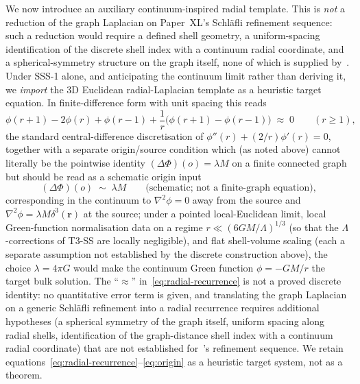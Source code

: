 \documentclass[12pt]{article}
\theoremstyle{definition}
\theoremstyle{remark}
\begin{document}
We now introduce an auxiliary continuum-inspired radial template. This is \emph{not} a reduction of the graph Laplacian on Paper~XL's Schl\"afli refinement sequence: such a reduction would require a defined shell geometry, a uniform-spacing identification of the discrete shell index with a continuum radial coordinate, and a spherical-symmetry structure on the graph itself, none of which is supplied by~\citep{SmartXL}. Under SSS-1 alone, and anticipating the continuum limit rather than deriving it, we \emph{import} the 3D Euclidean radial-Laplacian template as a heuristic target equation. In finite-difference form with unit spacing this reads
\begin{equation}\label{eq:radial-recurrence}
\phi(r+1) - 2\phi(r) + \phi(r-1) + \frac{1}{r}\bigl(\phi(r+1) - \phi(r-1)\bigr) \;\approx\; 0 \qquad (r \geq 1),
\end{equation}
the standard central-difference discretisation of $\phi''(r) + (2/r) \phi'(r) = 0$, together with a separate origin/source condition which (as noted above) cannot literally be the pointwise identity $(\Delta \Phi)(o) = \lambda M$ on a finite connected graph but should be read as a schematic origin input
\begin{equation}\label{eq:origin}
(\Delta \Phi)(o) \;\sim\; \lambda M \qquad \text{(schematic; not a finite-graph equation),}
\end{equation}
corresponding in the continuum to $\nabla^2 \phi = 0$ away from the source and $\nabla^2 \phi = \lambda M \delta^3(\mathbf{r})$ at the source; under a pointed local-Euclidean limit, local Green-function normalisation data on a regime $r \ll (6GM/\Lambda)^{1/3}$ (so that the $\Lambda$-corrections of T3-SS are locally negligible), and flat shell-volume scaling (each a separate assumption not established by the discrete construction above), the choice $\lambda = 4\pi G$ would make the continuum Green function $\phi = -GM/r$ the target bulk solution. The ``$\approx$'' in~\eqref{eq:radial-recurrence} is not a proved discrete identity: no quantitative error term is given, and translating the graph Laplacian on a generic Schl\"afli refinement into a radial recurrence requires additional hypotheses (a spherical symmetry of the graph itself, uniform spacing along radial shells, identification of the graph-distance shell index with a continuum radial coordinate) that are not established for~\citep{SmartXL}'s refinement sequence. We retain equations~\eqref{eq:radial-recurrence}--\eqref{eq:origin} as a heuristic target system, not as a theorem.
\end{document}
